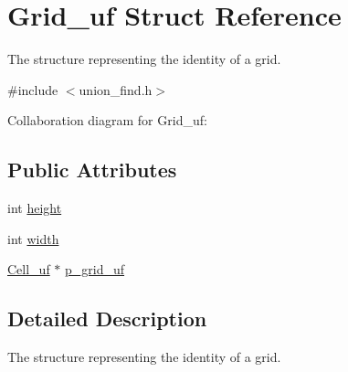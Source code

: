 \hypertarget{structGrid__uf}{\section{Grid\-\_\-uf Struct Reference}
\label{structGrid__uf}
}


The structure representing the identity of a grid.  




{\ttfamily \#include $<$union\-\_\-find.\-h$>$}



Collaboration diagram for Grid\-\_\-uf\-:
\subsection*{Public Attributes}
\begin{DoxyCompactItemize}
\item 
int \hyperlink{structGrid__uf_a62c33989b80447749f70f1b6e659da59}{height}
\item 
int \hyperlink{structGrid__uf_a8e67d779eff88c8263ceb63a73599671}{width}
\item 
\hyperlink{structCell__uf}{Cell\-\_\-uf} $\ast$ \hyperlink{structGrid__uf_ab282730f76d88757830a713eef053a4c}{p\-\_\-grid\-\_\-uf}
\end{DoxyCompactItemize}


\subsection{Detailed Description}
The structure representing the identity of a grid. 

